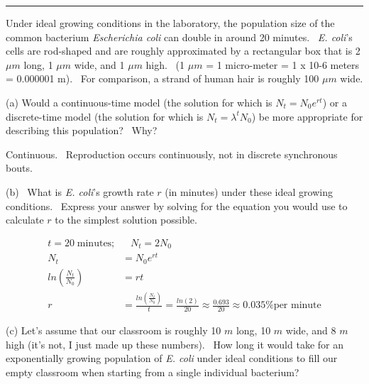 \documentclass{article}
\newcommand{\note}[1]{\colorbox{gray!30}{#1}}
\begin{document}
\noindent{}

\rule[0.5ex]{\linewidth}{1pt}

Under ideal growing conditions in the laboratory, the population size of the common bacterium \emph{Escherichia coli} can double in around 20 minutes.  \emph{E. coli}'s cells are rod-shaped and are roughly approximated by a rectangular box that is 2 $\mu m$ long, 1 $\mu m$ wide, and 1 $\mu m$ high.  (1 $\mu m$ = 1 micro-meter = 1 x 10-6 meters = 0.000001 m).  For comparison, a strand of human hair is roughly 100 $\mu m$ wide.

\vspace{1cm}

(a) Would a continuous-time model (the solution for which is $N_t=N_0 e^{rt}$) or a discrete-time model (the solution for which is $N_t = \lambda^t N_0$) be more appropriate for describing this population?  Why?

\vspace{1cm}

\note{Continuous.  Reproduction occurs continuously, not in discrete synchronous bouts.}

\vspace{1cm}

(b)  What is \emph{E. coli}'s growth rate $r$ (in minutes) under these ideal growing conditions.  Express your answer by solving for the equation you would use to calculate $r$ to the simplest solution possible.

\vspace{1cm}
\begin{align*}
	t=20 \; \text{minutes;} &\;\;\; N_t= 2 N_0\\
	N_t&=N_0 e^{rt}\\
	ln\left(\frac{N_t}{N_0}\right)&=rt\\
	r&=\frac{ln\left(\frac{N_t}{N_0}\right)}{t}=\frac{ln(2)}{20} \approx \frac{0.693}{20} \approx 0.035 \% \text{per minute}
\end{align*}

\vspace{1cm}
(c) Let's assume that our classroom is roughly 10 $m$ long, 10 $m$ wide, and 8 $m$ high (it’s not, I just made up these numbers).  How long it would take for an exponentially growing population of \emph{E. coli} under ideal conditions to fill our empty classroom when starting from a single individual bacterium?
\end{document}

